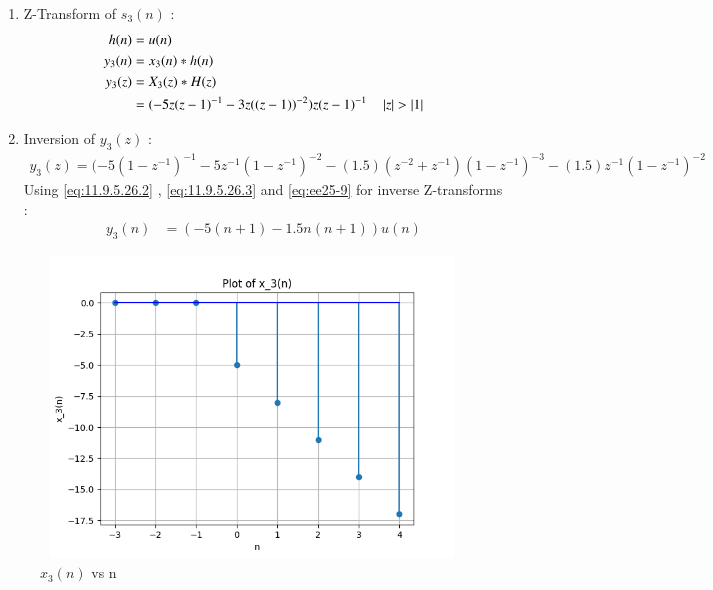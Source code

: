 \documentclass[journal,12pt,onecolumn]{IEEEtran}
\theoremstyle{remark}
\begin{document}
\begin{enumerate}[(i)]
\begin{enumerate}[1.]
    \vspace{0.5cm}
\item
Z-Transform of $s_3(n)$ :
\begin{align}
         h(n) &= u(n) \\
    y_3(n) &= x_3(n) * h(n) \\
    y_3(z) &= X_3(z) * H(z)\\
             &= (-5z(z-1)^{-1}-
       3z((z-1))^{-2})z(z-1)^{-1}
\quad \left\vert z\right\vert>\left\vert1\right\vert 
    \end{align}

    \item
Inversion of $y_3(z)$ :
\begin{align}
    y_3(z) = (-5(1-z^{-1})^{-1} - 5z^{-1}(1-z^{-1})^{-2} - (1.5)(z^{-2} + z^{-1})(1-z^{-1})^{-3} - (1.5)z^{-1}(1-z^{-1})^{-2}  
\end{align}
Using \eqref{eq:11.9.5.26.2} , \eqref{eq:11.9.5.26.3} and \eqref{eq:ee25-9} for inverse Z-transforms :
\begin{align}
 y_3(n) &= (-5(n+1) - 1.5n(n+1))u(n)   
\end{align}
    \end{enumerate}



\begin{figure}[!ht]   
\centering
\graphicspath{ {figs/} }
\includegraphics[width=12cm, height=8cm]{graph_3}
\caption{$x_3(n)$ vs n }\label{graph:ee25-g4}
\end{figure}
 \end{enumerate}
\end{document}
